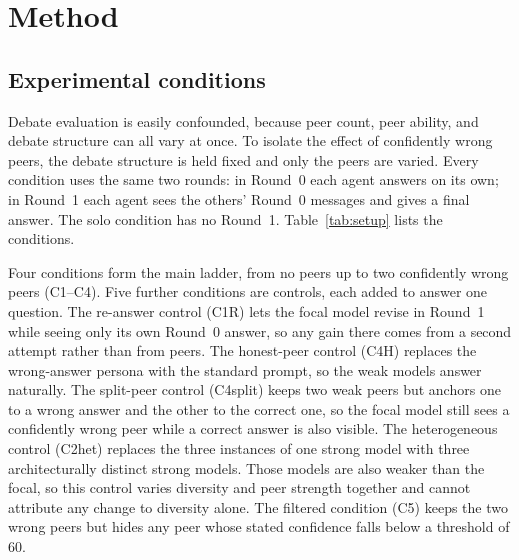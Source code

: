 \documentclass[11pt]{article}
\begin{document}
\section{Method}
\label{sec:method}

\subsection{Experimental conditions}
\label{sub:conditions}

Debate evaluation is easily confounded, because peer count, peer ability,
and debate structure can all vary at once.
To isolate the effect of confidently wrong peers, the debate structure is
held fixed and only the peers are varied.
Every condition uses the same two rounds: in Round~0 each agent answers on
its own; in Round~1 each agent sees the others' Round~0 messages and gives
a final answer.
The solo condition has no Round~1.
Table~\ref{tab:setup} lists the conditions.

Four conditions form the main ladder, from no peers up to two confidently
wrong peers (C1--C4).
Five further conditions are controls, each added to answer one question.
The re-answer control (C1R) lets the focal model revise in Round~1 while
seeing only its own Round~0 answer, so any gain there comes from a second
attempt rather than from peers.
The honest-peer control (C4H) replaces the wrong-answer persona with the
standard prompt, so the weak models answer naturally.
The split-peer control (C4split) keeps two weak peers but anchors one to a
wrong answer and the other to the correct one, so the focal model still sees a
confidently wrong peer while a correct answer is also visible.
The heterogeneous control (C2het) replaces the three instances of one strong
model with three architecturally distinct strong models. Those models are also
weaker than the focal, so this control varies diversity and peer strength
together and cannot attribute any change to diversity alone.
The filtered condition (C5) keeps the two wrong peers but hides any peer
whose stated confidence falls below a threshold of $60$.
\end{document}
